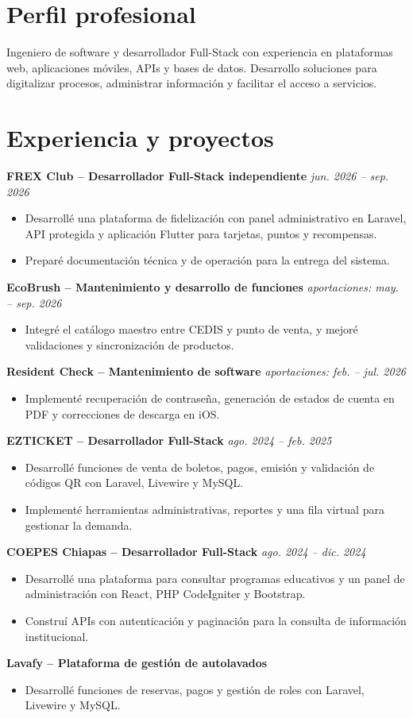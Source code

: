 \section{Perfil profesional}
Ingeniero de software y desarrollador Full-Stack con experiencia en plataformas web, aplicaciones m\'oviles, APIs y bases de datos. Desarrollo soluciones para digitalizar procesos, administrar informaci\'on y facilitar el acceso a servicios.

\section{Experiencia y proyectos}
\textbf{FREX Club -- Desarrollador Full-Stack independiente} \hfill \textit{jun. 2026 -- sep. 2026}
\begin{itemize}
    \item Desarroll\'e una plataforma de fidelizaci\'on con panel administrativo en Laravel, API protegida y aplicaci\'on Flutter para tarjetas, puntos y recompensas.
    \item Prepar\'e documentaci\'on t\'ecnica y de operaci\'on para la entrega del sistema.
\end{itemize}
\textbf{EcoBrush -- Mantenimiento y desarrollo de funciones} \hfill \textit{aportaciones: may. -- sep. 2026}
\begin{itemize}
    \item Integr\'e el cat\'alogo maestro entre CEDIS y punto de venta, y mejor\'e validaciones y sincronizaci\'on de productos.
\end{itemize}
\textbf{Resident Check -- Mantenimiento de software} \hfill \textit{aportaciones: feb. -- jul. 2026}
\begin{itemize}
    \item Implement\'e recuperaci\'on de contrase\~na, generaci\'on de estados de cuenta en PDF y correcciones de descarga en iOS.
\end{itemize}
\textbf{EZTICKET -- Desarrollador Full-Stack} \hfill \textit{ago. 2024 -- feb. 2025}
\begin{itemize}
    \item Desarroll\'e funciones de venta de boletos, pagos, emisi\'on y validaci\'on de c\'odigos QR con Laravel, Livewire y MySQL.
    \item Implement\'e herramientas administrativas, reportes y una fila virtual para gestionar la demanda.
\end{itemize}
\textbf{COEPES Chiapas -- Desarrollador Full-Stack} \hfill \textit{ago. 2024 -- dic. 2024}
\begin{itemize}
    \item Desarroll\'e una plataforma para consultar programas educativos y un panel de administraci\'on con React, PHP CodeIgniter y Bootstrap.
    \item Constru\'i APIs con autenticaci\'on y paginaci\'on para la consulta de informaci\'on institucional.
\end{itemize}
\textbf{Lavafy -- Plataforma de gesti\'on de autolavados}
\begin{itemize}
    \item Desarroll\'e funciones de reservas, pagos y gesti\'on de roles con Laravel, Livewire y MySQL.
\end{itemize}


